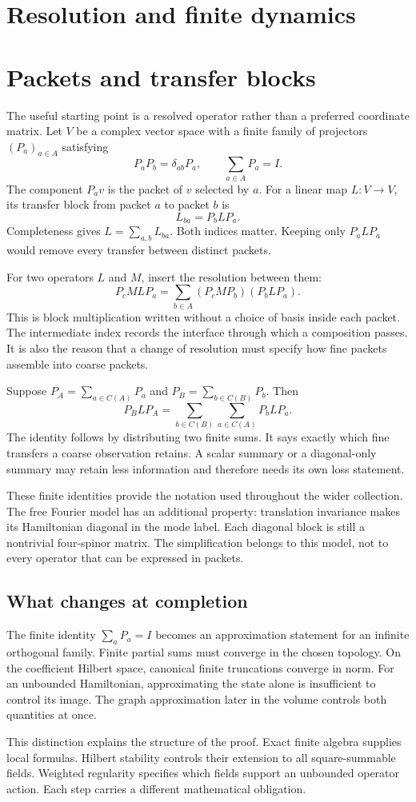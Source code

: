 \clearpage
\section*{Resolution and finite dynamics}
\section{Packets and transfer blocks}
The useful starting point is a resolved operator rather than a preferred coordinate matrix. Let $V$ be a complex vector space with a finite family of projectors $(P_a)_{a\in A}$ satisfying
\[
P_aP_b=\delta_{ab}P_a,\qquad \sum_{a\in A}P_a=I.
\]
The component $P_av$ is the packet of $v$ selected by $a$. For a linear map $L:V\to V$, its transfer block from packet $a$ to packet $b$ is
\[
L_{ba}=P_bLP_a.
\]
Completeness gives $L=\sum_{a,b}L_{ba}$. Both indices matter. Keeping only $P_aLP_a$ would remove every transfer between distinct packets.

For two operators $L$ and $M$, insert the resolution between them:
\[
P_cMLP_a=\sum_{b\in A}(P_cMP_b)(P_bLP_a).
\]
This is block multiplication written without a choice of basis inside each packet. The intermediate index records the interface through which a composition passes. It is also the reason that a change of resolution must specify how fine packets assemble into coarse packets.

Suppose $P_A=\sum_{a\in C(A)}P_a$ and $P_B=\sum_{b\in C(B)}P_b$. Then
\[
P_BLP_A=\sum_{b\in C(B)}\sum_{a\in C(A)}P_bLP_a.
\]
The identity follows by distributing two finite sums. It says exactly which fine transfers a coarse observation retains. A scalar summary or a diagonal-only summary may retain less information and therefore needs its own loss statement.

These finite identities provide the notation used throughout the wider collection. The free Fourier model has an additional property: translation invariance makes its Hamiltonian diagonal in the mode label. Each diagonal block is still a nontrivial four-spinor matrix. The simplification belongs to this model, not to every operator that can be expressed in packets.

\subsection{What changes at completion}
The finite identity $\sum_aP_a=I$ becomes an approximation statement for an infinite orthogonal family. Finite partial sums must converge in the chosen topology. On the coefficient Hilbert space, canonical finite truncations converge in norm. For an unbounded Hamiltonian, approximating the state alone is insufficient to control its image. The graph approximation later in the volume controls both quantities at once.

This distinction explains the structure of the proof. Exact finite algebra supplies local formulas. Hilbert stability controls their extension to all square-summable fields. Weighted regularity specifies which fields support an unbounded operator action. Each step carries a different mathematical obligation.
